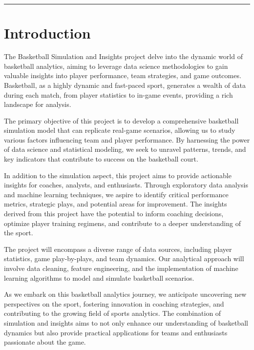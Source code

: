 \documentclass[
]{article}
\begin{document}
\begin{center}\rule{0.5\linewidth}{0.5pt}\end{center}

\hypertarget{introduction}{%
\section{Introduction}\label{introduction}}

The Basketball Simulation and Insights project delve into the dynamic
world of basketball analytics, aiming to leverage data science
methodologies to gain valuable insights into player performance, team
strategies, and game outcomes. Basketball, as a highly dynamic and
fast-paced sport, generates a wealth of data during each match, from
player statistics to in-game events, providing a rich landscape for
analysis.

The primary objective of this project is to develop a comprehensive
basketball simulation model that can replicate real-game scenarios,
allowing us to study various factors influencing team and player
performance. By harnessing the power of data science and statistical
modeling, we seek to unravel patterns, trends, and key indicators that
contribute to success on the basketball court.

In addition to the simulation aspect, this project aims to provide
actionable insights for coaches, analysts, and enthusiasts. Through
exploratory data analysis and machine learning techniques, we aspire to
identify critical performance metrics, strategic plays, and potential
areas for improvement. The insights derived from this project have the
potential to inform coaching decisions, optimize player training
regimens, and contribute to a deeper understanding of the sport.

The project will encompass a diverse range of data sources, including
player statistics, game play-by-plays, and team dynamics. Our analytical
approach will involve data cleaning, feature engineering, and the
implementation of machine learning algorithms to model and simulate
basketball scenarios.

As we embark on this basketball analytics journey, we anticipate
uncovering new perspectives on the sport, fostering innovation in
coaching strategies, and contributing to the growing field of sports
analytics. The combination of simulation and insights aims to not only
enhance our understanding of basketball dynamics but also provide
practical applications for teams and enthusiasts passionate about the
game.
\end{document}
